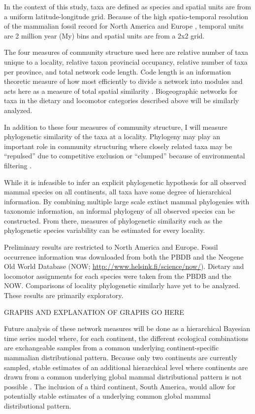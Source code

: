 \documentclass[11pt,letterpaper]{article}
\begin{document}
In the context of this study, taxa are defined as species and spatial units are from a uniform latitude-longitude grid. Because of the high spatio-temporal resolution of the mammalian fossil record for North America and Europe \citep{Alroy2009,Marcot2014,Fortelius2002,Jernvall2004}, temporal units are 2 million year (My) bins and spatial units are from a 2x2 grid. 

The four measures of community structure used here are relative number of taxa unique to a locality, relative taxon provincial occupancy, relative number of taxa per province, and total network code length. Code length is an information theoretic measure of how most efficiently to divide a network into modules and acts here as a measure of total spatial similarity \citep{Rosvall2008,Rosvall2009a}. Biogeographic networks for taxa in the dietary and locomotor categories described above will be similarly analyzed.

In addition to these four measures of community structure, I will measure phylogenetic similarity of the taxa at a locality. Phylogeny may play an important role in community structuring where closely related taxa may be ``repulsed'' due to competitive exclusion or ``clumped'' because of environmental filtering \citep{Webb2002}. 

While it is infeasible to infer an explicit phylogenetic hypothesis for all observed mammal species on all continents, all taxa have some degree of hierarchical information. By combining multiple large scale extinct mammal phylogenies with taxonomic information, an informal phylogeny of all observed species can be constructed. From there, measures of phylogenetic similarity such as the phylogenetic species variability \citep{Helmus2007a} can be estimated for every locality. 

Preliminary results are restricted to North America and Europe. Fossil occurrence information was downloaded from both the PBDB and the Neogene Old World Database (NOW; \url{http://www.helsink.fi/science/now/}). Dietary and locomotor assignments for each species were taken from the PBDB and the NOW. Comparisons of locality phylogenetic similarly have yet to be analyzed. These results are primarily exploratory. 

\uppercase{graphs and explanation of graphs go here}

Future analysis of these network measures will be done as a hierarchical Bayesian time series model where, for each continent, the different ecological combinations are exchangeable samples from a common underlying continent-specific mammalian distributional pattern. Because only two continents are currently sampled, stable estimates of an additional hierarchical level where continents are drawn from a common underlying global mammal distributional pattern is not possible \citep{Gelman2013d}. The inclusion of a third continent, South America, would allow for potentially stable estimates of a underlying common global mammal distributional pattern. %
\end{document}

